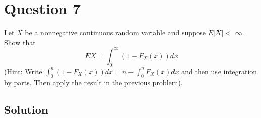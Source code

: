\section*{Question 7}

Let \( X \) be a nonnegative continuous random variable and suppose \( E|X|< \) \( \infty \). Show that
\begin{equation*}
    E X=\int_{0}^{\infty}\left(1-F_{X}(x)\right) d x
\end{equation*}
(Hint: Write \( \int_{0}^{n}\left(1-F_{X}(x)\right) d x=n-\int_{0}^{n} F_{X}(x) d x \) and then use integration by parts.
Then apply the result in the previous problem).

\subsection*{Solution}
